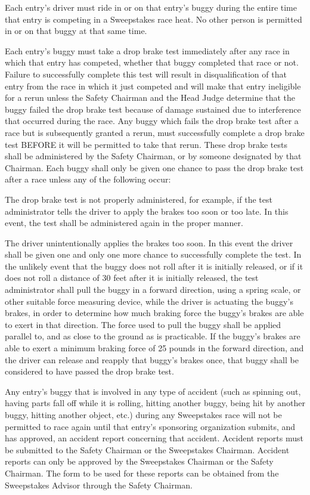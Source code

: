 	Each entry's driver must ride in or on that entry's buggy during the entire
	time that entry is competing in a Sweepstakes race heat. No other person is
	permitted in or on that buggy at that same time.

	Each entry's buggy must take a drop brake test immediately after any race in
	which that entry has competed, whether that buggy completed that race or not.
	Failure to successfully complete this test will result in disqualification of
	that entry from the race in which it just competed and will make that entry
	ineligible for a rerun unless the Safety Chairman and the Head Judge determine
	that the buggy failed the drop brake test because of damage sustained due to
	interference that occurred during the race. Any buggy which fails the drop
	brake test after a race but is subsequently granted a rerun, must successfully
	complete a drop brake test BEFORE it will be permitted to take that rerun.
	These drop brake tests shall be administered by the Safety Chairman, or by
	someone designated by that Chairman. Each buggy shall only be given one chance
	to pass the drop brake test after a race unless any of the following occur:

	The drop brake test is not properly administered, for example, if the test
	administrator tells the driver to apply the brakes too soon or too late. In
	this event, the test shall be administered again in the proper manner.

	The driver unintentionally applies the brakes too soon. In this event the
	driver shall be given one and only one more chance to successfully complete the
	test. In the unlikely event that the buggy does not roll after it is initially
	released, or if it does not roll a distance of 30 feet after it is initially
	released, the test administrator shall pull the buggy in a forward direction,
	using a spring scale, or other suitable force measuring device, while the
	driver is actuating the buggy's brakes, in order to determine how much braking
	force the buggy's brakes are able to exert in that direction. The force used to
	pull the buggy shall be applied parallel to, and as close to the ground as is
	practicable. If the buggy's brakes are able to exert a minimum braking force of
	25 pounds in the forward direction, and the driver can release and reapply that
	buggy's brakes once, that buggy shall be considered to have passed the drop
	brake test.

	Any entry's buggy that is involved in any type of accident (such as spinning
	out, having parts fall off while it is rolling, hitting another buggy, being
	hit by another buggy, hitting another object, etc.) during any Sweepstakes race
	will not be permitted to race again until that entry's sponsoring organization
	submits, and has approved, an accident report concerning that accident.
	Accident reports must be submitted to the Safety Chairman or the Sweepstakes
	Chairman. Accident reports can only be approved by the Sweepstakes Chairman or
	the Safety Chairman. The form to be used for these reports can be obtained from
	the Sweepstakes Advisor through the Safety Chairman.

